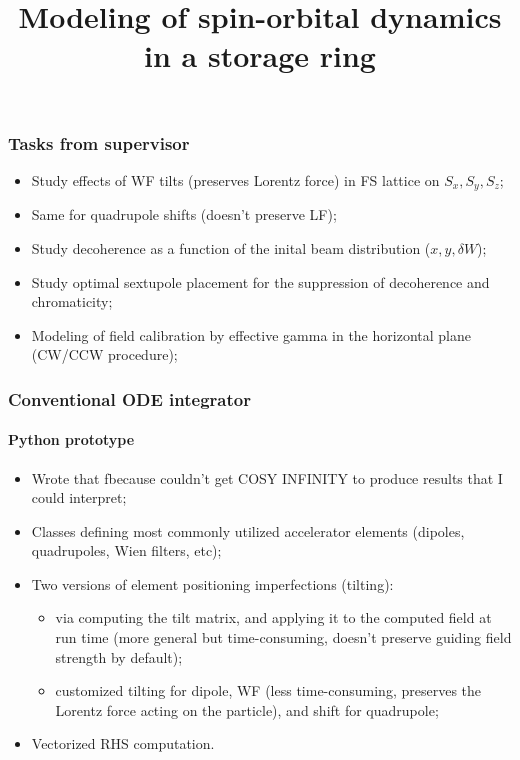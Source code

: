 \documentclass[pdf]{beamer}
\title{Modeling of spin-orbital dynamics in a storage ring}
\begin{document}
	\begin{frame}
		\titlepage
	\end{frame}	

	\begin{frame}
		\frametitle{Tasks from supervisor}
		\begin{itemize}
			\item Study effects of WF tilts (preserves Lorentz force) in FS lattice on $S_x, S_y, S_z$;
			\item Same for quadrupole shifts (doesn't preserve LF);
			\item Study decoherence as a function of the inital beam distribution ($x, y, \delta W$);
			\item Study optimal sextupole placement for the suppression of decoherence and chromaticity;
			\item Modeling of field calibration by effective gamma in the horizontal plane (CW/CCW procedure);
		\end{itemize}
	\end{frame}

	\begin{frame}
		\frametitle{Conventional ODE integrator}
		\framesubtitle{Python prototype}
		\begin{itemize}
			\item Wrote that fbecause couldn't get COSY INFINITY to produce results that I could interpret;
			\item Classes defining most commonly utilized accelerator elements (dipoles, quadrupoles, Wien filters, etc);
			\item Two versions of element positioning imperfections (tilting):
			\begin{itemize}
				\item via computing the tilt matrix, and applying it to the computed field at run time (more general but time-consuming, doesn't preserve guiding field strength by default);
				\item customized tilting for dipole, WF (less time-consuming, preserves the Lorentz force acting on the particle), and shift for quadrupole;
			\end{itemize}
		\item Vectorized RHS computation.
		\end{itemize}
	\end{frame}
\end{document}
